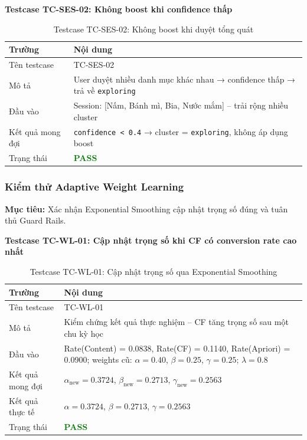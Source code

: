 \documentclass[12pt,a4paper]{report}
\begin{document}
\textbf{Testcase TC-SES-02: Không boost khi confidence thấp}

\begin{table}[htbp]
\centering
\renewcommand{\arraystretch}{1.3}
\begin{tabular}{|l|p{8cm}|}
\hline
\rowcolor[HTML]{EFEFEF}
\textbf{Trường} & \textbf{Nội dung} \\ \hline
Tên testcase & TC-SES-02 \\ \hline
Mô tả & User duyệt nhiều danh mục khác nhau → confidence thấp → trả về \texttt{exploring} \\ \hline
Đầu vào & Session: [Nấm, Bánh mì, Bia, Nước mắm] -- trải rộng nhiều cluster \\ \hline
Kết quả mong đợi & \texttt{confidence < 0.4} → cluster = \texttt{exploring}, không áp dụng boost \\ \hline
Trạng thái & \textcolor{green}{\textbf{PASS}} \\ \hline
\end{tabular}
\caption{Testcase TC-SES-02: Không boost khi duyệt tổng quát}
\end{table}

\subsubsection{Kiểm thử Adaptive Weight Learning}

\textbf{Mục tiêu:} Xác nhận Exponential Smoothing cập nhật trọng số đúng và tuân thủ Guard Rails.

\textbf{Testcase TC-WL-01: Cập nhật trọng số khi CF có conversion rate cao nhất}

\begin{table}[htbp]
\centering
\renewcommand{\arraystretch}{1.3}
\begin{tabular}{|l|p{8cm}|}
\hline
\rowcolor[HTML]{EFEFEF}
\textbf{Trường} & \textbf{Nội dung} \\ \hline
Tên testcase & TC-WL-01 \\ \hline
Mô tả & Kiểm chứng kết quả thực nghiệm -- CF tăng trọng số sau một chu kỳ học \\ \hline
Đầu vào & Rate(Content) = 0.0838, Rate(CF) = 0.1140, Rate(Apriori) = 0.0900; weights cũ: $\alpha=0.40$, $\beta=0.25$, $\gamma=0.25$; $\lambda=0.8$ \\ \hline
Kết quả mong đợi & $\alpha_{\text{new}} = 0.3724$, $\beta_{\text{new}} = 0.2713$, $\gamma_{\text{new}} = 0.2563$ \\ \hline
Kết quả thực tế & $\alpha = 0.3724$, $\beta = 0.2713$, $\gamma = 0.2563$ \\ \hline
Trạng thái & \textcolor{green}{\textbf{PASS}} \\ \hline
\end{tabular}
\caption{Testcase TC-WL-01: Cập nhật trọng số qua Exponential Smoothing}
\end{table}
\end{document}
